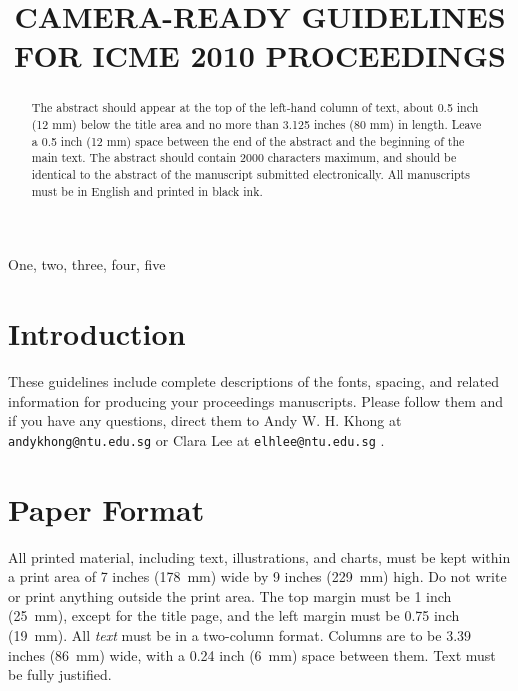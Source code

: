 \documentclass{article}
\begin{document}
\sloppy

\def\x{{\mathbf x}}
\def\L{{\cal L}}


\title{CAMERA-READY GUIDELINES FOR ICME 2010 PROCEEDINGS}
%
\address{Author Affiliation(s) \\
Email: abc@xyz.com}


\maketitle
\thispagestyle{fancy} \fancyhead{} \lhead{}
 \cfoot{}
\renewcommand{\headrulewidth}{0pt}
\renewcommand{\footrulewidth}{0pt}




%
\begin{abstract}
The abstract should appear at the top of the left-hand column of
text, about 0.5 inch (12 mm) below the title area and no more than
3.125 inches (80 mm) in length.  Leave a 0.5 inch (12 mm) space
between the end of the abstract and the beginning of the main text.
The abstract should contain 2000 characters maximum, and should be
identical to the abstract of the manuscript submitted
electronically. All manuscripts must be in English and printed in
black ink.
\end{abstract}
%
\begin{keywords}
One, two, three, four, five
\end{keywords}
%
\section{Introduction}
\label{sec:intro}

These guidelines include complete descriptions of the fonts,
spacing, and related information for producing your proceedings
manuscripts. Please follow them and if you have any questions,
direct them to Andy W. H. Khong at \verb"andykhong@ntu.edu.sg" or
Clara Lee at \verb"elhlee@ntu.edu.sg" .

\section{Paper Format}
\label{sec:format}

All printed material, including text, illustrations, and charts,
must be kept within a print area of 7 inches (178~mm) wide by 9
inches (229~mm) high. Do not write or print anything outside the
print area. The top margin must be 1 inch (25~mm), except for the
title page, and the left margin must be 0.75 inch (19~mm).  All {\it
text} must be in a two-column format. Columns are to be 3.39 inches
(86~mm) wide, with a 0.24 inch (6~mm) space between them. Text must
be fully justified.
\end{document}
